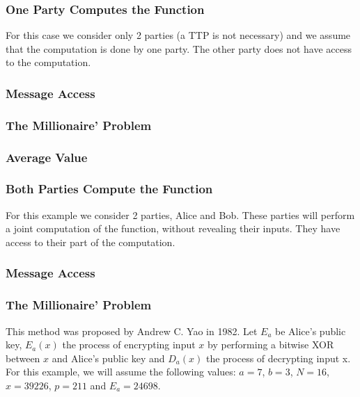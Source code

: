 \begin{refsection}
\subsubsection{One Party Computes the Function}
For this case we consider only 2 parties (a TTP is not necessary) and we assume that the computation is done by one party.
The other party does not have access to the computation.

\subsubsection{Message Access}
\subsubsection{The Millionaire' Problem}
\subsubsection{Average Value}

\subsubsection{Both Parties Compute the Function}
For this example we consider 2 parties, Alice and Bob. These parties will perform a joint computation of the function, without revealing
their inputs. They have access to their part of the computation.

\subsubsection{Message Access}
\subsubsection{The Millionaire' Problem}
This method was proposed by Andrew C. Yao in 1982. Let $E_a$ be Alice's public key, $E_a(x)$ the process of encrypting input $x$ by performing
a bitwise XOR between $x$ and Alice's public key and $D_a(x)$ the process of decrypting input x.
For this example, we will assume the following values: $a = 7$, $b = 3$, $N = 16$, $x = 39226$, $p = 211$ and $E_a = 24698$.


\end{refsection}
